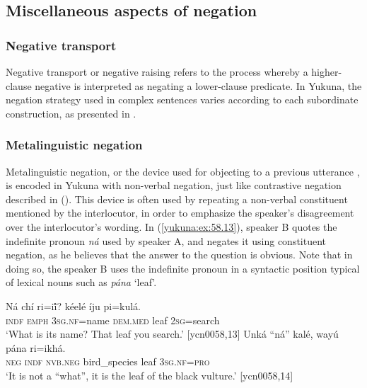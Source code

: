 \documentclass[output=paper,colorlinks,citecolor=brown]{langscibook}
\begin{document}
\subsection{Miscellaneous aspects of negation}\label{yukuna:other}

\subsubsection{Negative transport}\label{yukuna:transport}

Negative transport or negative raising refers to the process whereby a higher-clause negative is
interpreted as negating a lower-clause predicate. In Yukuna, the negation strategy used in complex sentences varies according to each subordinate construction, as presented in .  

\subsubsection{Metalinguistic negation}\label{yukuna:meta}

Metalinguistic negation, or the device used for objecting to a previous utterance \citep[363]{Horn1989}, is encoded in Yukuna with non-verbal negation, just like contrastive negation described in (). This device is often used by repeating a non-verbal constituent mentioned by the interlocutor, in order to emphasize the speaker's disagreement over the interlocutor's wording. In (\ref{yukuna:ex:58.13}), speaker B quotes the indefinite pronoun \textit{ná} used by speaker A, and negates it using constituent negation, as he believes that the answer to the question is obvious. Note that in doing so, the speaker B uses the indefinite pronoun in a syntactic position typical of lexical nouns such as \textit{pána} `leaf'. 

\ea\label{yukuna:ex:58.13}
    \begin{xlist}[B: ]
    \label{yukuna:ex:58.13a}
        \gll Ná chí ri=iĩ́? kéelé íju pi=kulá.\\
        \textsc{indf} \textsc{emph} \textsc{3sg.nf}=name \textsc{dem.med}  leaf \textsc{2sg}=search\\
        \glt ‘What is its name? That leaf you search.’ [ycn0058,13]
    \label{yukuna:ex:58.13b}
        \gll Unká “ná” kalé, wayú pána ri=ikhá. \\
        \textsc{neg} \textsc{indf} \textsc{nvb.neg} bird\_species leaf \textsc{3sg.nf=pro} \\ 
        \glt ‘It is not a “what”, it is the leaf of the black vulture.’ [ycn0058,14]
    \end{xlist}
\z
\end{document}

